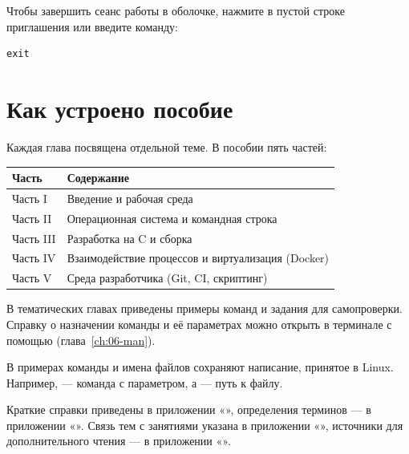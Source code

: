 Чтобы завершить сеанс работы в оболочке, нажмите  в пустой
строке приглашения или введите команду:
\begin{verbatim}
exit
\end{verbatim}

\section{Как устроено пособие}

Каждая глава посвящена отдельной теме. В пособии пять частей:

\begin{center}
\begin{tabular}{ll}
\toprule
\textbf{Часть} & \textbf{Содержание} \\
\midrule
Часть I  & Введение и рабочая среда \\
Часть II  & Операционная система и командная строка \\
Часть III & Разработка на C и сборка \\
Часть IV & Взаимодействие процессов и виртуализация (Docker) \\
Часть V & Среда разработчика (Git, CI, скриптинг) \\
\bottomrule
\end{tabular}
\end{center}

В тематических главах приведены примеры команд и задания для самопроверки. Справку о
назначении команды и её параметрах можно открыть в терминале с помощью
 (глава~\ref{ch:06-man}).

В примерах команды и имена файлов сохраняют написание, принятое в Linux.
Например,  --- команда с параметром, а  ---
путь к файлу.

Краткие справки приведены в приложении «»,
определения терминов --- в приложении «». Связь тем с занятиями указана в приложении
«», источники для дополнительного чтения --- в
приложении «».
